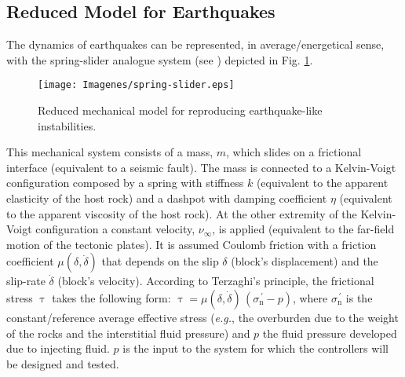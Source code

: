 \documentclass[journal,twoside,web]{ieeecolor}
\begin{document}
\subsection{Reduced Model for Earthquakes}

The dynamics of earthquakes can be represented, in average/energetical sense, with the spring-slider analogue system (see \cite{b:Stefanou2019,b:Stefanou2020,b:Scholz-2002,b:Kanamori-Brodsky-2004,b:Tzortzopoulos-Braun-Stefanou-2021}) depicted in Fig. \ref{fig:spring-slider}. 

\begin{figure}[ht!]
  \centering 
  \texttt{[image: Imagenes/spring-slider.eps]}
  \caption{Reduced mechanical model for reproducing earthquake-like instabilities.}
  \label{fig:spring-slider}
\end{figure}

This mechanical system consists of a mass, $m$, which slides on a frictional interface (equivalent to a seismic fault). The mass is connected to a Kelvin-Voigt configuration composed by a spring with stiffness $k$ (equivalent to the apparent elasticity of the host rock) and a dashpot with damping coefficient $\eta$ (equivalent to the apparent viscosity of the host rock). At the other extremity of the Kelvin-Voigt configuration a constant velocity, $\nu_\infty$, is applied (equivalent to the far-field motion of the tectonic plates). It is assumed Coulomb friction with a friction coefficient $\mu(\delta,\dot{\delta})$ that depends on the slip $\delta$ (block's displacement) and the slip-rate $\dot{\delta}$ (block's velocity). According to Terzaghi's principle, the frictional stress $\uptau$ takes the following form: $\uptau=\mu(\delta,\dot{\delta})\hspace{2pt}(\sigma^{\, \prime}_{\text{n}}-p)$, where $\sigma^{\, \prime}_{\text{n}}$ is the constant/reference average effective stress (\textit{e.g.}, the overburden due to the weight of the rocks and the interstitial fluid pressure) and $p$ the fluid pressure developed due to injecting fluid. $p$ is the input to the system for which the controllers will be designed and tested.

\end{document}
